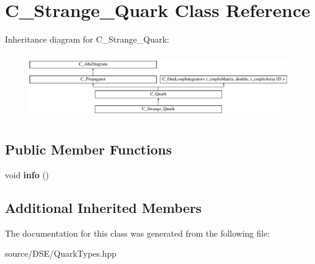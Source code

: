 \hypertarget{class_c___strange___quark}{\section{C\-\_\-\-Strange\-\_\-\-Quark Class Reference}
\label{class_c___strange___quark}
}
Inheritance diagram for C\-\_\-\-Strange\-\_\-\-Quark\-:\begin{figure}[H]
\begin{center}
\leavevmode
\includegraphics[height=2.871795cm]{class_c___strange___quark}
\end{center}
\end{figure}
\subsection*{Public Member Functions}
\begin{DoxyCompactItemize}
\item 
\hypertarget{class_c___strange___quark_a0248a7e570a7825efbe2b9064ac2043d}{void {\bfseries info} ()}\label{class_c___strange___quark_a0248a7e570a7825efbe2b9064ac2043d}

\end{DoxyCompactItemize}
\subsection*{Additional Inherited Members}


The documentation for this class was generated from the following file\-:\begin{DoxyCompactItemize}
\item 
source/\-D\-S\-E/Quark\-Types.\-hpp\end{DoxyCompactItemize}
